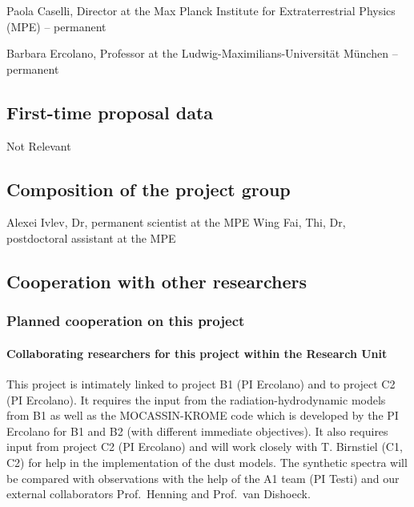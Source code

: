 \documentclass[10pt,fleqn,twoside]{article}
\begin{document}
Paola Caselli, Director at the Max Planck Institute for Extraterrestrial Physics (MPE) -- permanent 

Barbara Ercolano, Professor at the Ludwig-Maximilians-Universit\"at
M\"unchen -- permanent

\subsection{First-time proposal data}

Not Relevant

\subsection{Composition of the project group}

Alexei Ivlev, Dr, permanent scientist at the MPE 
Wing Fai, Thi, Dr, postdoctoral assistant at the MPE

\subsection{Cooperation with other researchers}

\subsubsection{Planned cooperation on this project}

\paragraph{Collaborating researchers for this project within the
  Research Unit}

This project is intimately linked to project B1 (PI Ercolano) and to project C2 (PI Ercolano). 
It requires the input from the radiation-hydrodynamic models from B1 as well as the MOCASSIN-KROME code which is developed by the PI Ercolano for B1 and B2 (with different immediate objectives). It also requires input from project C2 (PI Ercolano) and will work closely with T. Birnstiel (C1, C2) for help in the implementation of the dust models. The synthetic spectra will be compared with observations with the help of the A1 team (PI Testi) and our external collaborators Prof.\ Henning and Prof.\ van Dishoeck. 
\end{document}
